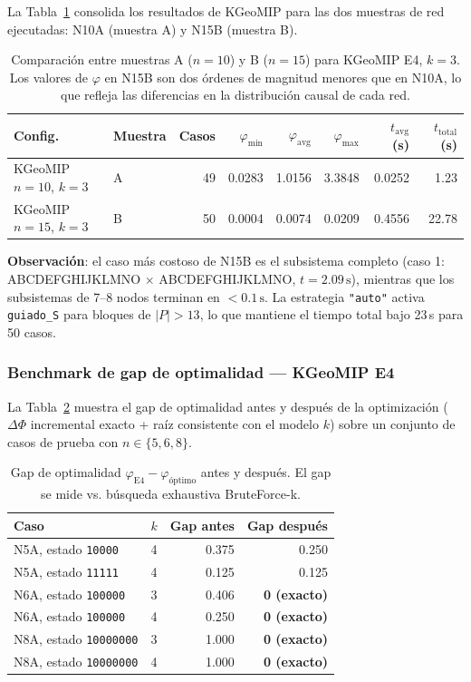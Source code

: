 La Tabla~\ref{tab:comparacion_muestras} consolida los resultados de KGeoMIP
para las dos muestras de red ejecutadas: N10A (muestra A) y N15B (muestra B).

\begin{table}[H]
\centering
\begin{tabular}{llrrrrrr}
  \toprule
  \textbf{Config.} & \textbf{Muestra} & \textbf{Casos} &
  $\varphi_{\min}$ & $\varphi_{\mathrm{avg}}$ & $\varphi_{\max}$ &
  $t_{\mathrm{avg}}$ (s) & $t_{\mathrm{total}}$ (s) \\
  \midrule
  KGeoMIP $n=10$, $k=3$ & A & 49 & 0.0283 & 1.0156 & 3.3848 & 0.0252 &  1.23 \\
  KGeoMIP $n=15$, $k=3$ & B & 50 & 0.0004 & 0.0074 & 0.0209 & 0.4556 & 22.78 \\
  \bottomrule
\end{tabular}
\caption{Comparación entre muestras A ($n=10$) y B ($n=15$) para KGeoMIP E4, $k=3$.
  Los valores de $\varphi$ en N15B son dos órdenes de magnitud menores que en N10A,
  lo que refleja las diferencias en la distribución causal de cada red.}
\label{tab:comparacion_muestras}
\end{table}

\textbf{Observación}: el caso más costoso de N15B es el subsistema completo
(caso 1: ABCDEFGHIJKLMNO $\times$ ABCDEFGHIJKLMNO, $t=2.09\,\text{s}$),
mientras que los subsistemas de 7--8 nodos terminan en $<0.1\,\text{s}$.
La estrategia \texttt{"auto"} activa \texttt{guiado\_S} para bloques de
$|P| > 13$, lo que mantiene el tiempo total bajo 23\,s para 50 casos.

\subsubsection*{Benchmark de gap de optimalidad — KGeoMIP E4}

La Tabla~\ref{tab:gap_geomip} muestra el gap de optimalidad antes y después
de la optimización ($\Delta\Phi$ incremental exacto + raíz consistente con el
modelo $k$) sobre un conjunto de casos de prueba con $n \in \{5,6,8\}$.

\begin{table}[H]
\centering
\begin{tabular}{lcrr}
  \toprule
  \textbf{Caso} & $k$ & \textbf{Gap antes} & \textbf{Gap después} \\
  \midrule
  N5A, estado \texttt{10000} & 4 & 0.375 & 0.250 \\
  N5A, estado \texttt{11111} & 4 & 0.125 & 0.125 \\
  N6A, estado \texttt{100000} & 3 & 0.406 & \textbf{0 (exacto)} \\
  N6A, estado \texttt{100000} & 4 & 0.250 & \textbf{0 (exacto)} \\
  N8A, estado \texttt{10000000} & 3 & 1.000 & \textbf{0 (exacto)} \\
  N8A, estado \texttt{10000000} & 4 & 1.000 & \textbf{0 (exacto)} \\
  \bottomrule
\end{tabular}
\caption{Gap de optimalidad $\varphi_{\text{E4}} - \varphi_{\text{óptimo}}$ antes y
  después. El gap se mide vs. búsqueda exhaustiva BruteForce-k.}
\label{tab:gap_geomip}
\end{table}


